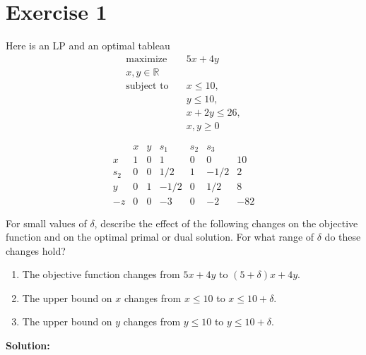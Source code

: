 \documentclass{article}
\begin{document}
\section*{Exercise 1}
Here is an LP and an optimal tableau
\begin{align*}
\text{maximize} \quad & 5x + 4y \\
x, y \in \mathbb{R} & \\
\text{subject to} \quad & x \leq 10, \\
& y \leq 10, \\
& x + 2y \leq 26, \\
& x, y \geq 0
\end{align*}

$$\begin{array}{c|ccccc|c}
& x & y & s_1 & s_2 & s_3 & \\
\hline
x & 1 & 0 & 1 & 0 & 0 & 10 \\
s_2 & 0 & 0 & 1/2 & 1 & -1/2 & 2 \\
y & 0 & 1 & -1/2 & 0 & 1/2 & 8 \\
\hline
-z & 0 & 0 & -3 & 0 & -2 & -82
\end{array}$$

For small values of $\delta$, describe the effect of the following changes on the objective function and on the optimal primal or dual solution. For what range of $\delta$ do these changes hold?

\begin{enumerate}[label=(\alph*)]
    \item The objective function changes from $5x + 4y$ to $(5 + \delta)x + 4y$.

    \item The upper bound on $x$ changes from $x \leq 10$ to $x \leq 10 + \delta$.

    \item The upper bound on $y$ changes from $y \leq 10$ to $y \leq 10 + \delta$.
\end{enumerate}

\textbf{Solution: }
\end{document}
